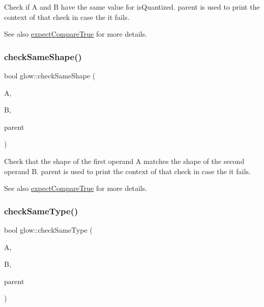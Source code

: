 Check if {\ttfamily A} and {\ttfamily B} have the same value for is\+Quantized. {\ttfamily parent} is used to print the context of that check in case the it fails. \begin{DoxySeeAlso}{See also}
\hyperlink{namespaceglow_afd8e77c649bf3668467058ae071bb875}{expect\+Compare\+True} for more details. 
\end{DoxySeeAlso}
\mbox{\label{namespaceglow_ae06ad0f896240c6ccea6cb9472e57e2a}} 
\subsubsection{\texorpdfstring{check\+Same\+Shape()}{checkSameShape()}}
{\footnotesize\ttfamily bool glow\+::check\+Same\+Shape (\begin{DoxyParamCaption}\item[{\hyperlink{structglow_1_1_node_value}{Node\+Value}}]{A,  }\item[{\hyperlink{structglow_1_1_node_value}{Node\+Value}}]{B,  }\item[{const \hyperlink{classglow_1_1_node}{Node} $\ast$}]{parent }\end{DoxyParamCaption})}

Check that the shape of the first operand {\ttfamily A} matches the shape of the second operand {\ttfamily B}. {\ttfamily parent} is used to print the context of that check in case the it fails. \begin{DoxySeeAlso}{See also}
\hyperlink{namespaceglow_afd8e77c649bf3668467058ae071bb875}{expect\+Compare\+True} for more details. 
\end{DoxySeeAlso}
\mbox{\label{namespaceglow_a1963e99917ffdb1fdd70911811002792}} 
\subsubsection{\texorpdfstring{check\+Same\+Type()}{checkSameType()}}
{\footnotesize\ttfamily bool glow\+::check\+Same\+Type (\begin{DoxyParamCaption}\item[{\hyperlink{structglow_1_1_node_value}{Node\+Value}}]{A,  }\item[{\hyperlink{structglow_1_1_node_value}{Node\+Value}}]{B,  }\item[{const \hyperlink{classglow_1_1_node}{Node} $\ast$}]{parent }\end{DoxyParamCaption})}

